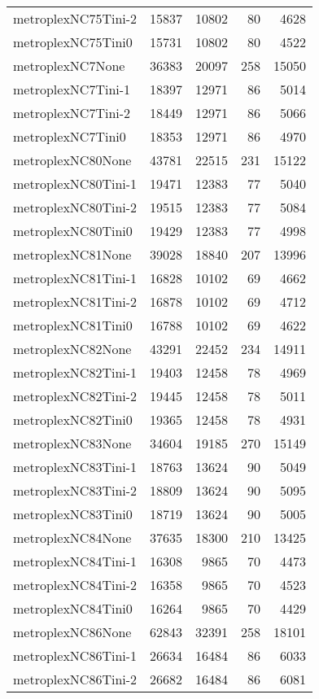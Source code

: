 \begin{longtable}{lrrrr}
metroplexNC75Tini-2 & 15837 & 10802 & 80 & 4628 \\
metroplexNC75Tini0 & 15731 & 10802 & 80 & 4522 \\
metroplexNC7None & 36383 & 20097 & 258 & 15050 \\
metroplexNC7Tini-1 & 18397 & 12971 & 86 & 5014 \\
metroplexNC7Tini-2 & 18449 & 12971 & 86 & 5066 \\
metroplexNC7Tini0 & 18353 & 12971 & 86 & 4970 \\
metroplexNC80None & 43781 & 22515 & 231 & 15122 \\
metroplexNC80Tini-1 & 19471 & 12383 & 77 & 5040 \\
metroplexNC80Tini-2 & 19515 & 12383 & 77 & 5084 \\
metroplexNC80Tini0 & 19429 & 12383 & 77 & 4998 \\
metroplexNC81None & 39028 & 18840 & 207 & 13996 \\
metroplexNC81Tini-1 & 16828 & 10102 & 69 & 4662 \\
metroplexNC81Tini-2 & 16878 & 10102 & 69 & 4712 \\
metroplexNC81Tini0 & 16788 & 10102 & 69 & 4622 \\
metroplexNC82None & 43291 & 22452 & 234 & 14911 \\
metroplexNC82Tini-1 & 19403 & 12458 & 78 & 4969 \\
metroplexNC82Tini-2 & 19445 & 12458 & 78 & 5011 \\
metroplexNC82Tini0 & 19365 & 12458 & 78 & 4931 \\
metroplexNC83None & 34604 & 19185 & 270 & 15149 \\
metroplexNC83Tini-1 & 18763 & 13624 & 90 & 5049 \\
metroplexNC83Tini-2 & 18809 & 13624 & 90 & 5095 \\
metroplexNC83Tini0 & 18719 & 13624 & 90 & 5005 \\
metroplexNC84None & 37635 & 18300 & 210 & 13425 \\
metroplexNC84Tini-1 & 16308 & 9865 & 70 & 4473 \\
metroplexNC84Tini-2 & 16358 & 9865 & 70 & 4523 \\
metroplexNC84Tini0 & 16264 & 9865 & 70 & 4429 \\
metroplexNC86None & 62843 & 32391 & 258 & 18101 \\
metroplexNC86Tini-1 & 26634 & 16484 & 86 & 6033 \\
metroplexNC86Tini-2 & 26682 & 16484 & 86 & 6081 \\

\end{longtable}
